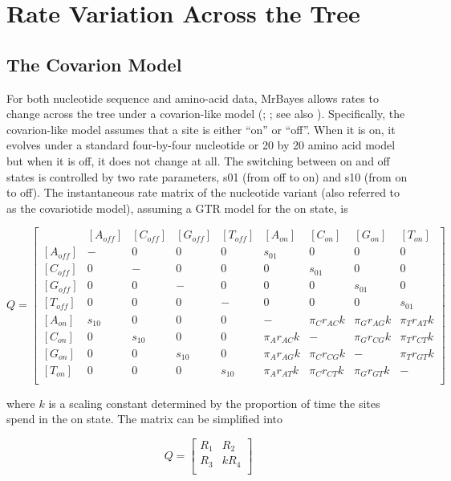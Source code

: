 \documentclass[12pt]{book}
\begin{document}
\section{Rate Variation Across the Tree}

\subsection{The Covarion Model}
For both nucleotide sequence and amino-acid data, MrBayes allows rates to change across the tree
under a covarion-like model (\citet{tuffley98}; \citet{huelsenbeck02a}; see also
\citet{galtier01}). Specifically, the covarion-like model assumes that a site is either ``on'' or
``off''. When it is on, it evolves under a standard four-by-four nucleotide or 20 by 20 amino acid
model but when it is off, it does not change at all. The switching between on and off states is
controlled by two rate parameters, s01 (from off to on) and s10 (from on to off). The instantaneous
rate matrix of the nucleotide variant (also referred to as the covariotide model), assuming a GTR
model for the on state, is

\footnotesize
\[
Q=\begin{bmatrix}
    & [A_{off}] & [C_{off}] & [G_{off}] & [T_{off}] & [A_{on}] & [C_{on}] & [G_{on}] & [T_{on}]\\
 [A_{off}]& - & 0 & 0 & 0 & s_{01} & 0 & 0 & 0 \\
 [C_{off}]& 0 & - & 0 & 0 & 0 & s_{01} & 0 & 0 \\
 [G_{off}]& 0 & 0 & - & 0 & 0 & 0 & s_{01} & 0 \\
 [T_{off}]& 0 & 0 & 0 & - & 0 & 0 & 0 & s_{01} \\
 [A_{on}]& s_{10} & 0 & 0 & 0 & - & \pi_C r_{AC} k  & \pi_G r_{AG} k & \pi_T r_{AT} k  \\
 [C_{on}]& 0 & s_{10} & 0 & 0 & \pi_A r_{AC} k  & - & \pi_G r_{CG} k & \pi_T r_{CT} k  \\
 [G_{on}]& 0 & 0 & s_{10} & 0 & \pi_A r_{AG} k  & \pi_C r_{CG} k & - & \pi_T r_{GT} k  \\
 [T_{on}]& 0 & 0 & 0 & s_{10} & \pi_A r_{AT} k  & \pi_C r_{CT} k &  \pi_G r_{GT} k &-  \\
\end{bmatrix}
\]
\normalsize

where $k$ is a scaling constant determined by the proportion of time the sites spend in the on
state. The matrix can be simplified into

\[
Q=\begin{bmatrix}
  R_1 & R_2\\
  R_3 & k R_4\\
\end{bmatrix}
\]
\end{document}
